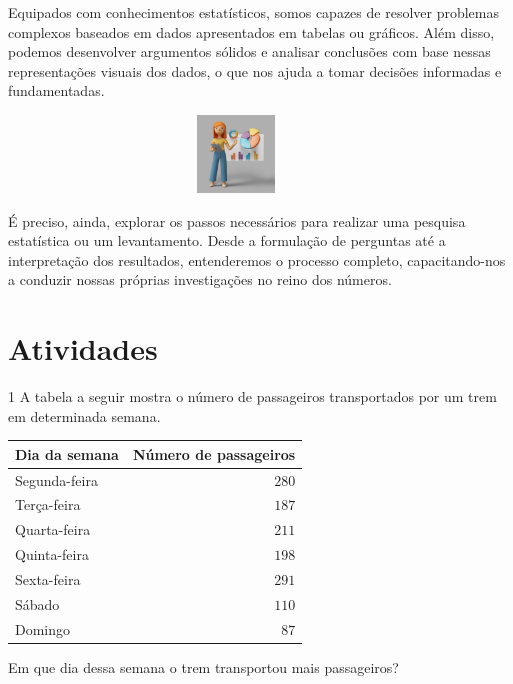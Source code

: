 {{{{{Equipados com conhecimentos estatísticos, somos capazes de resolver problemas
complexos baseados em dados apresentados em tabelas ou gráficos. Além disso,
podemos desenvolver argumentos sólidos e analisar conclusões com base nessas
representações visuais dos dados, o que nos ajuda a tomar decisões informadas e
fundamentadas.

\begin{figure}[H]
\centering\includegraphics[width=3.92708in,height=0.8125in]{./imgSAEB_6_MAT/media/image136.png}
\end{figure}

É preciso, ainda, explorar os passos necessários para realizar uma pesquisa
estatística ou um levantamento. Desde a formulação de perguntas até a
interpretação dos resultados, entenderemos o processo completo,
capacitando-nos a conduzir nossas próprias investigações no reino dos números.}

\section*{Atividades}

\num{1}  A tabela a seguir mostra o número de passageiros transportados por um
trem em determinada semana.

\begin{table}[H]\centering
\begin{tabular}[]{lr}
\toprule
Dia da semana & Número de passageiros\\
\midrule
Segunda-feira & $280$\\
Terça-feira & $187$\\
Quarta-feira & $211$\\
Quinta-feira & $198$\\
Sexta-feira & $291$\\
Sábado & $110$\\
Domingo & $87$\\
\bottomrule
\end{tabular}
\end{table}

Em que dia dessa semana o trem transportou mais passageiros?


}}}}
